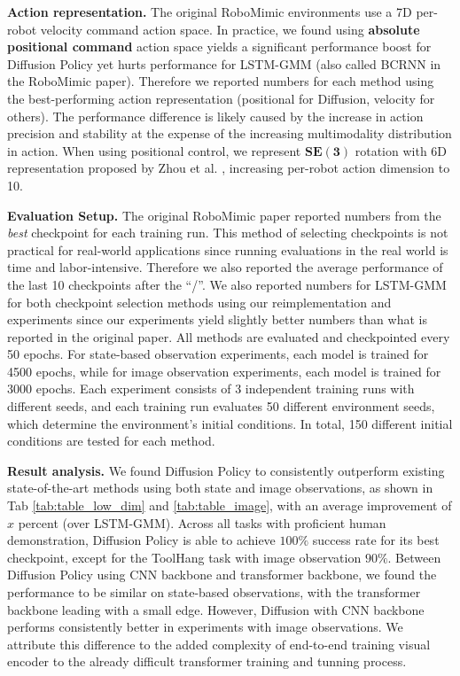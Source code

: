 \begin{table}
\centering

\caption{Summary of RoboMimic \cite{robomimic} task properties. }
\label{tab:robomimic_tasks}
\end{table}


\textbf{Action representation.} The original RoboMimic environments \cite{robomimic} use a 7D per-robot velocity command action space. In practice, we found using \textbf{absolute positional command} action space yields a significant performance boost for Diffusion Policy yet hurts performance for LSTM-GMM (also called BCRNN in the RoboMimic paper). Therefore we reported numbers for each method using the best-performing action representation (positional for Diffusion, velocity for others). The performance difference is likely caused by the increase in action precision and stability at the expense of the increasing multimodality distribution in action. When using positional control, we represent $\mathbf{SE(3)}$ rotation with 6D representation proposed by Zhou et al. \cite{zhou2019continuity}, increasing per-robot action dimension to 10.


 \textbf{Evaluation Setup.} The original RoboMimic paper reported numbers from the \textit{best} checkpoint for each training run. This method of selecting checkpoints is not practical for real-world applications since running evaluations in the real world is time and labor-intensive. Therefore we also reported the average performance of the last 10 checkpoints after the ``/''. We also reported numbers for LSTM-GMM for both checkpoint selection methods using our reimplementation and experiments since our experiments yield slightly better numbers than what is reported in the original paper. All methods are evaluated and checkpointed every 50 epochs. For state-based observation experiments, each model is trained for 4500 epochs, while for image observation experiments, each model is trained for 3000 epochs. Each experiment consists of 3 independent training runs with different seeds, and each training run evaluates 50 different environment seeds, which determine the environment's initial conditions. In total, 150 different initial conditions are tested for each method. 


 \textbf{Result analysis.} We found Diffusion Policy to consistently outperform existing state-of-the-art methods using both state and image observations, as shown in Tab \ref{tab:table_low_dim} and \ref{tab:table_image}, with an average improvement of $x$ percent (over LSTM-GMM). Across all tasks with proficient human demonstration, Diffusion Policy is able to achieve $100\% $ success rate for its best checkpoint, except for the ToolHang task with image observation $90\% $. 
 Between Diffusion Policy using CNN backbone and transformer backbone, we found the performance to be similar on state-based observations, with the transformer backbone leading with a small edge. However, Diffusion with CNN backbone performs consistently better in experiments with image observations. We attribute this difference to the added complexity of end-to-end training visual encoder to the already difficult transformer training and tunning process. 

